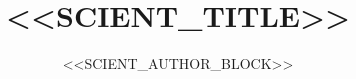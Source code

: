 \documentclass[11pt,a4paper]{article}
\title{<<SCIENT_TITLE>>}
\author{<<SCIENT_AUTHOR_BLOCK>>}
\date{}
\begin{document}
\maketitle

\par
\end{document}
